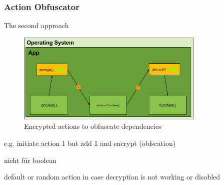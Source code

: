 \subsubsection{Action Obfuscator} \label{subsubsectionection:counter-replace-encryption-content-obfuscator}
The second approach
\begin{figure}[h]
    \centering
    \includegraphics[width=0.8\textwidth]{data/encryptionAction.png}
    \caption{Encrypted actions to obfuscate dependencies}
    \label{fig:encryptionAction}
\end{figure}

e.g. initiate action 1 but add 1 and encrypt (obfscation)

nicht für boolean

default or random action in case decryption is not working or disabled
